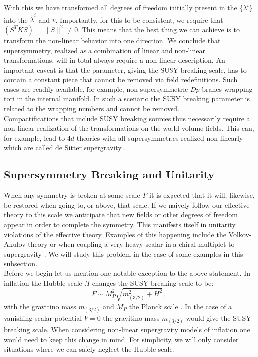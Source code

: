 \documentclass[a4paper,12pt,twoside,openright]{report}
\newcommand{\be}{\begin{equation}}
\newcommand{\ee}{\end{equation}}
\begin{document}
With this we have transformed all degrees of freedom initially present in the $\{\lambda^i\}$ into the $\tilde{\lambda}^i$ and $v$. Importantly, for this to be consistent, we require that $ \left( S^T K S \right) = \| S \|^2 \neq0$. This means that the best thing we can achieve is to transform the non-linear behavior into one direction. We conclude that supersymmetry, realized as a combination of linear and non-linear transformations, will in total always require a non-linear description. An important caveat is that the parameter, giving the SUSY breaking scale, has to contain a constant piece that cannot be removed via field redefinitions. Such cases are readily available, for example, non-supersymmetric $Dp$-branes wrapping tori in the internal manifold. In such a scenario the SUSY breaking parameter is related to the wrapping numbers and cannot be removed.\\
Compactifications that include SUSY breaking sources thus necessarily require a non-linear realization of the transformations on the world volume fields. This can, for example, lead to $4d$ theories with all supersymmetries realized non-linearly which are called de Sitter supergravity \cite{Antoniadis:2014oya,Dudas:2015eha,Bergshoeff:2015tra,Hasegawa:2015bza,Kallosh:2015sea,Schillo:2015ssx}.

\subsection{Supersymmetry Breaking and Unitarity}
When any symmetry is broken at some scale $F$ it is expected that it will, likewise, be restored when going to, or above, that scale. If we naively follow our effective theory to this scale we anticipate that new fields or other degrees of freedom appear in order to complete the symmetry. This manifests itself in unitarity violations of the effective theory. Examples of this happening include the Volkov-Akulov theory \cite{Volkov:1972jx,Volkov:1973ix} or when coupling a very heavy scalar in a chiral multiplet to supergravity \cite{Casalbuoni:1988sx}. We will study this problem in the case of some examples in this subsection.\\
Before we begin let us mention one notable exception to the above statement. In inflation the Hubble scale $H$ changes the SUSY breaking scale to be:
\be 
F \sim M_P^2 \sqrt{m^2_{(3/2)} + H^2 } \,,
\ee
with the gravitino mass $m_{(3/2)}$ and $M_P$ the Planck scale \cite{Kallosh:2000ve,DallAgata:2014qsj,Ferrara:2015tyn,Carrasco:2015iij,Ferrara:2016een}. In the case of a vanishing scalar potential $V=0$ the gravitino mass $m_{(3/2)}$ would give the SUSY breaking scale. When considering non-linear supergravity models of inflation one would need to keep this change in mind. For simplicity, we will only consider situations where we can safely neglect the Hubble scale.
\end{document}
